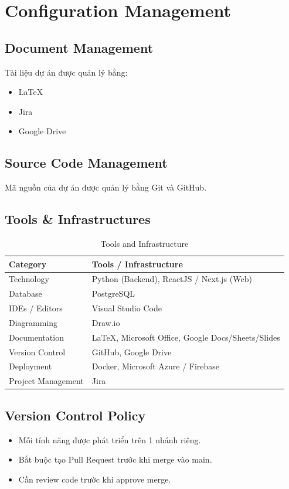 \section{Configuration Management}

\subsection{Document Management}

Tài liệu dự án được quản lý bằng:

\begin{itemize}
	\item LaTeX
	\item Jira
	\item Google Drive
\end{itemize}


\subsection{Source Code Management}

Mã nguồn của dự án được quản lý bằng Git và GitHub.


\subsection{Tools \& Infrastructures}

\begin{table}[H]
	\centering
	\small
	\caption{Tools and Infrastructure}
	\begin{tabularx}{\textwidth}{|L{4cm}|Y|}
		\hline
		\textbf{Category} & \textbf{Tools / Infrastructure} \\ \hline
		
		Technology & Python (Backend), ReactJS / Next.js (Web) \\ \hline
		Database & PostgreSQL \\ \hline
		IDEs / Editors & Visual Studio Code \\ \hline
		Diagramming & Draw.io \\ \hline
		Documentation & LaTeX, Microsoft Office, Google Docs/Sheets/Slides \\ \hline
		Version Control & GitHub, Google Drive \\ \hline
		Deployment & Docker, Microsoft Azure / Firebase \\ \hline
		Project Management & Jira \\ \hline
		
	\end{tabularx}
\end{table}


\subsection{Version Control Policy}

\begin{itemize}
	\item Mỗi tính năng được phát triển trên 1 nhánh riêng.
	\item Bắt buộc tạo Pull Request trước khi merge vào main.
	\item Cần review code trước khi approve merge.
\end{itemize}